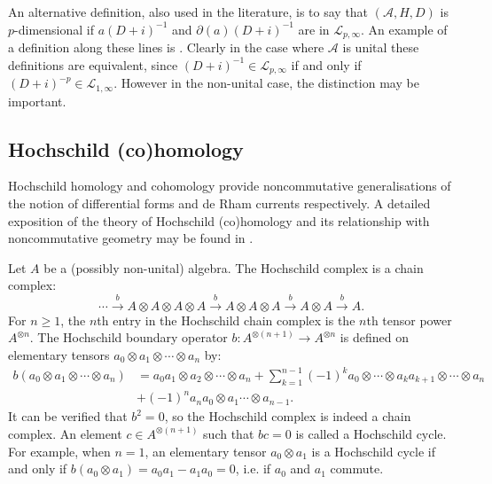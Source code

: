     An alternative definition, also used in the literature, is to say that $(\mathcal{A},H,D)$ is $p$-dimensional if $a(D+i)^{-1}$ and $\partial(a)(D+i)^{-1}$ are in $\mathcal{L}_{p,\infty}$. 
    An example of a definition along these lines is \cite[Definition 3.1]{gayral-moyal}.
    Clearly in the case where $\mathcal{A}$ is unital these definitions are equivalent, since $(D+i)^{-1} \in \mathcal{L}_{p,\infty}$ if and only if $(D+i)^{-p} \in \mathcal{L}_{1,\infty}$. 
    However in the non-unital case, the distinction may be important. 
    


\subsection{Hochschild (co)homology}\label{hochschild subsection}
    Hochschild homology and cohomology provide noncommutative generalisations of the notion of differential forms and de Rham currents
    respectively. A detailed exposition of the theory of Hochschild (co)homology and its relationship with noncommutative geometry may be found in \cite{Quillen,Loday-cyclic-homology}.
    
    Let $A$ be a (possibly non-unital) algebra. The Hochschild complex is a chain complex:
    \begin{equation*}
        \cdots \xrightarrow{b} A\otimes A\otimes A\otimes A \xrightarrow{b} A\otimes A\otimes A \xrightarrow{b} A \otimes A\xrightarrow{b} A.
    \end{equation*}
    For $n \geq 1$, the $n$th entry in the Hochschild chain complex is the $n$th tensor power $A^{\otimes n}$. The Hochschild boundary operator $b:A^{\otimes (n+1)}\to A^{\otimes n}$
    is defined on elementary tensors $a_0\otimes a_1\otimes\cdots \otimes a_n$ by:
    \begin{align*}
        b(a_0\otimes a_1\otimes \cdots \otimes a_n) &= a_0a_1\otimes a_2\otimes \cdots\otimes a_n + \sum_{k=1}^{n-1} (-1)^k a_0\otimes \cdots \otimes a_ka_{k+1}\otimes\cdots \otimes a_n\\
                                                    &+ (-1)^na_na_0\otimes a_1\cdots\otimes a_{n-1}.
    \end{align*}
    It can be verified that $b^2 = 0$, so the Hochschild complex is indeed a chain complex. An element $c \in A^{\otimes (n+1)}$ such that $bc = 0$
    is called a Hochschild cycle. For example, when $n = 1$, an elementary tensor $a_0\otimes a_1$ is a Hochschild cycle if and only if $b(a_0\otimes a_1) = a_0a_1-a_1a_0 = 0$, i.e. if $a_0$ and
    $a_1$ commute.
    

